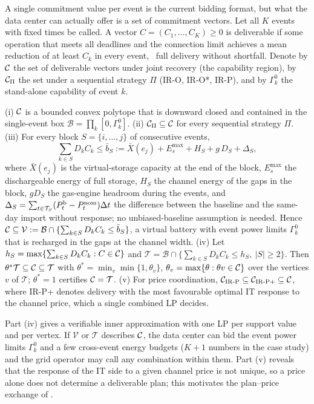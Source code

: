 A single commitment value per event is the current bidding format, but what the data center can actually offer is a
set of commitment vectors. Let all $K$ events with fixed times be called. A vector $C=(C_1,\dots,C_K)\ge0$ is
deliverable if some operation that meets all deadlines and the connection limit achieves a mean reduction of at least
$C_k$ in every event, \ie\ full delivery without shortfall. Denote by $\mathcal{C}$ the set of deliverable vectors under
joint recovery (the capability region), by $\mathcal{C}_\Pi$ the set under a sequential strategy $\Pi$ (IR-O, IR-O*, IR-P),
and by $\Gamma^0_k$ the stand-alone capability of event $k$.

\begin{proposition}\label{prop:region}
(i) $\mathcal{C}$ is a bounded convex polytope that is downward closed and contained in the single-event box
$\mathcal B=\prod_k[0,\Gamma^0_k]$. (ii) $\mathcal{C}_\Pi\subseteq\mathcal{C}$ for every sequential strategy $\Pi$. (iii) For every
block $S=\{i,\dots,j\}$ of consecutive events,
\begin{equation}
\sum_{k\in S}D_kC_k\le\bar b_S:=\bar X(e_j)+E_s^{\max}+H_S+g\,D_S+\Delta_S ,
\label{eq:multibound}
\end{equation}
where $\bar X(e_j)$ is the virtual-storage capacity at the end of the block, $E_s^{\max}$ the dischargeable energy of
full storage, $H_S$ the channel energy of the gaps in the block, $gD_S$ the gas-engine headroom during the events, and
$\Delta_S=\sum_{t\in\mathcal{T}_S}(P^{\mathrm{b}}_t-P^{\mathrm{nom}}_t)\Delta t$ the difference between the baseline and the same-day import
without response; no unbiased-baseline assumption is needed. Hence $\mathcal{C}\subseteq\mathcal V:=\mathcal B\cap\{\sum_{k\in
S}D_kC_k\le\bar b_S\}$, a virtual battery with event power limits $\Gamma^0_k$ that is recharged in the gaps at the
channel width. (iv) Let $h_S=\max\{\sum_{k\in S}D_kC_k:C\in\mathcal{C}\}$ and $\mathcal T=\mathcal B\cap\{\sum_{k\in S}D_kC_k\le
h_S,\ |S|\ge2\}$. Then $\theta^*\mathcal T\subseteq\mathcal{C}\subseteq\mathcal T$ with $\theta^*=\min_v\min\{1,\theta_v\}$,
$\theta_v=\max\{\theta:\theta v\in\mathcal{C}\}$ over the vertices $v$ of $\mathcal T$; $\theta^*=1$ certifies
$\mathcal{C}=\mathcal T$. (v) For price coordination, $\mathcal{C}_{\mathrm{IR\text{-}P}}\subseteq\mathcal{C}_{\mathrm{IR\text{-}P+}}\subseteq\mathcal{C}$,
where IR-P+ denotes delivery with the most favourable optimal IT response to the channel price, which a single
combined LP decides.
\end{proposition}

Part (iv) gives a verifiable inner approximation with one LP per support value and per vertex. If $\mathcal V$ or
$\mathcal T$ describes $\mathcal{C}$, the data center can bid the event power limits $\Gamma^0_k$ and a few cross-event energy
budgets ($K+1$ numbers in the case study) and the grid operator may call any combination within them. Part (v) reveals
that the response of the IT side to a given channel price is not unique, so a price alone does not determine a
deliverable plan; this motivates the plan--price exchange of .

